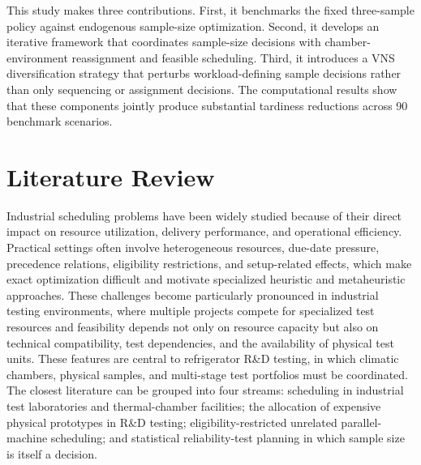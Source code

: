 \documentclass[11pt]{article}
\begin{document}
This study makes three contributions. First, it benchmarks the fixed three-sample policy against endogenous sample-size optimization. Second, it develops an iterative framework that coordinates sample-size decisions with chamber-environment reassignment and feasible scheduling. Third, it introduces a VNS diversification strategy that perturbs workload-defining sample decisions rather than only sequencing or assignment decisions. The computational results show that these components jointly produce substantial tardiness reductions across 90 benchmark scenarios.

\section{Literature Review}
\label{sec:literature_review}


Industrial scheduling problems have been widely studied because of their
direct impact on resource utilization, delivery performance, and operational
efficiency.
Practical settings often involve heterogeneous resources, due-date pressure,
precedence relations, eligibility restrictions, and setup-related effects,
which make exact optimization difficult and motivate specialized heuristic
and metaheuristic approaches.
These challenges become particularly pronounced in industrial testing
environments, where multiple projects compete for specialized test resources
and feasibility depends not only on resource capacity but also on technical
compatibility, test dependencies, and the availability of physical test units.
These features are central to refrigerator {R\&D} testing, in which climatic
chambers, physical samples, and multi-stage test portfolios must be
coordinated.
The closest literature can be grouped into four streams: scheduling in
industrial test laboratories and thermal-chamber facilities; the allocation
of expensive physical prototypes in {R\&D} testing; eligibility-restricted
unrelated parallel-machine scheduling; and statistical reliability-test
planning in which sample size is itself a decision.
\end{document}
